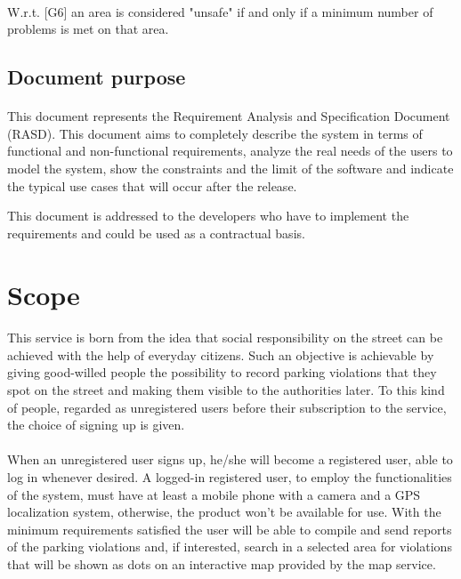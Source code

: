			\paragraph{}
				W.r.t. {[G6]} an area is considered "unsafe" if and only if a minimum number of problems is met on that area.
			\subsection{Document purpose}
				\paragraph{}
					This document represents the Requirement Analysis and Specification Document (RASD). This document aims to completely describe the system in terms of functional and non-functional requirements, analyze the real needs of the users to model the system, show the constraints and the limit of the software and indicate the typical use cases that will occur after the release. 
					
					This document is addressed to the developers who have to implement the requirements and could be used as a contractual basis.
		\section{Scope}
			\paragraph{}
				This service is born from the idea that social responsibility on the street can be achieved with the help of everyday citizens. Such an objective is achievable by giving good-willed people the possibility to record parking violations that they spot on the street and making them visible to the authorities later. To this kind of people, regarded as unregistered users before their subscription to the service, the choice of signing up is given.
				
			\paragraph{}
				When an unregistered user signs up, he/she will become a registered user, able to log in whenever desired. A logged-in registered user, to employ the functionalities of the system, must have at least a mobile phone with a camera and a GPS localization system, otherwise, the product won't be available for use. With the minimum requirements satisfied the user will be able to compile and send reports of the parking violations and, if interested, search in a selected area for violations that will be shown as dots on an interactive map provided by the map service.
 

